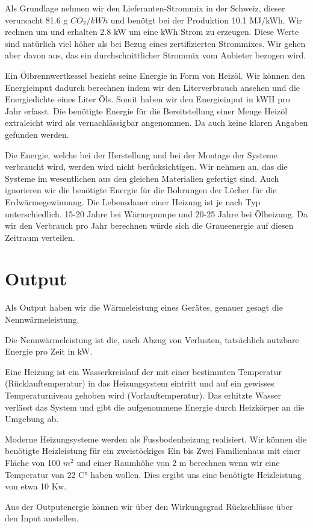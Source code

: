 Als Grundlage nehmen wir den Lieferanten-Strommix in der Schweiz\cite{bafu:strommix},
dieser verursacht 81.6 g $CO_2 /kWh$
und benötgt bei der Produktion 10.1 MJ/kWh. Wir rechnen um
und erhalten 2.8 kW um eine kWh Strom zu erzeugen.
Diese Werte sind natürlich viel höher als bei Bezug eines zertifizierten 
Strommixes. Wir gehen aber davon aus, das ein durchschnittlicher Strommix
vom Anbieter bezogen wird.

Ein Ölbrennwertkessel bezieht seine Energie in Form von Heizöl.
Wir können den Energieinput dadurch berechnen indem wir den Literverbrauch
ansehen und die Energiedichte eines Liter Öls. Somit haben wir den
Energieinput in kWH pro Jahr erfasst.
Die benötigte Energie für die Bereitstellung einer Menge Heizöl extraleicht
wird als vernachlässigbar angenommen. Da auch keine klaren Angaben gefunden
werden.

Die Energie, welche bei der Herstellung und bei der Montage der Systeme
verbraucht wird, werden wird nicht berücksichtigen.
Wir nehmen an, das die Systeme im wesentlichen aus den gleichen Materialien
gefertigt sind. Auch ignorieren wir die benötigte Energie für die Bohrungen der
Löcher für die Erdwärmegewinnung.
Die Lebensdauer einer Heizung ist je nach Typ unterschiedlich. 15-20 Jahre bei Wärmepumpe\cite{offerten24:wp} und 20-25 Jahre bei Ölheizung\cite{offerten24:oel}.
Da wir den Verbrauch pro Jahr berechnen würde sich die Graueenergie auf diesen
Zeitraum verteilen.

\section{Output}

Als Output haben wir die Wärmeleistung eines Gerätes, genauer gesagt die
Nennwärmeleistung.

Die Nennwärmeleistung ist die, nach Abzug von Verlusten, tatsächlich nutzbare
Energie pro Zeit in kW.\cite{heizung:nennwarmeleistung}

Eine Heizung ist ein Wasserkreislauf der mit einer bestimmten Temperatur
(Rücklauftemperatur) in das Heizungsystem eintritt und auf ein gewisses Temperaturniveau
gehoben wird (Vorlauftemperatur). Das erhitzte Wasser verlässt das System und
gibt die aufgenommene Energie durch Heizkörper an die Umgebung ab.
 
Moderne Heizungsysteme werden als Fussbodenheizung realisiert.
Wir können die benötigte Heizleistung für ein zweistöckiges Ein bis Zwei
Familienhaus mit einer Fläche von 100 $m^2$ und einer Raumhöhe von 2 m berechnen
wenn wir eine Temperatur von 22 C° haben wollen.
Dies ergibt uns eine benötigte Heizleistung von etwa 10 Kw.
\cite{heizung:berechnung}

Aus der Outputenergie können wir über den Wirkungsgrad Rückschlüsse über
den Input anstellen.










